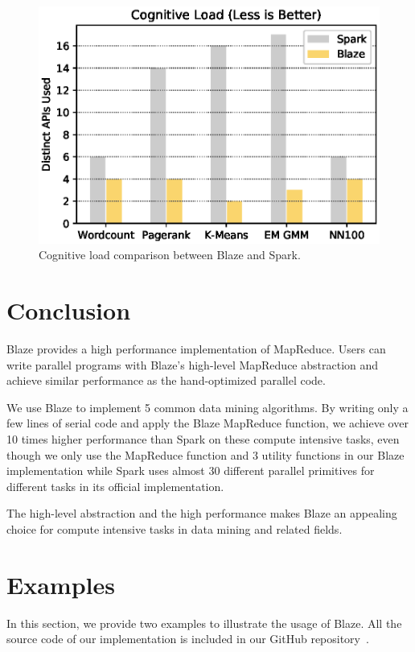 \begin{figure}
  \begin{center}
  \includegraphics[width=0.7\linewidth]{figs/cognitive.eps}
  \end{center}
  \vspace{-0.5cm}
  \caption{Cognitive load comparison between Blaze and Spark.}
  \label{fig:cog}
\end{figure}

\section{Conclusion}
\label{sec:con}
Blaze provides a high performance implementation of MapReduce.
Users can write parallel programs with Blaze's high-level MapReduce abstraction and achieve similar performance as the hand-optimized parallel code.

We use Blaze to implement 5 common data mining algorithms.
By writing only a few lines of serial code and apply the Blaze MapReduce function, we achieve over 10 times higher performance than Spark on these compute intensive tasks, even though we only use the MapReduce function and 3 utility functions in our Blaze implementation while Spark uses almost 30 different parallel primitives for different tasks in its official implementation.

The high-level abstraction and the high performance makes Blaze an appealing choice for compute intensive tasks in data mining and related fields.

\section{Examples}
In this section, we provide two examples to illustrate the usage of Blaze.
All the source code of our implementation is included in our GitHub repository~\cite{blaze}.

